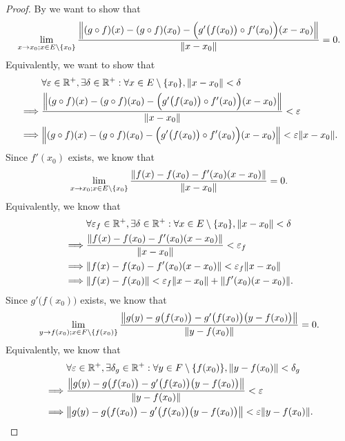\begin{proof}
  By  we want to show that
  \[
    \lim_{x \to x_0 ; x \in E \setminus \set{x_0}} \dfrac{\norm*{(g \circ f)(x) - (g \circ f)(x_0) - \Big(g'\big(f(x_0)\big) \circ f'(x_0)\Big)(x - x_0)}}{\norm*{x - x_0}} = 0.
  \]
  Equivalently, we want to show that
  \begin{align*}
             & \forall \varepsilon \in \R^+, \exists \delta \in \R^+ : \forall x \in E \setminus \set{x_0}, \norm*{x - x_0} < \delta                  \\
    \implies & \dfrac{\norm*{(g \circ f)(x) - (g \circ f)(x_0) - \Big(g'\big(f(x_0)\big) \circ f'(x_0)\Big)(x - x_0)}}{\norm*{x - x_0}} < \varepsilon \\
    \implies & \norm*{(g \circ f)(x) - (g \circ f)(x_0) - \Big(g'\big(f(x_0)\big) \circ f'(x_0)\Big)(x - x_0)} < \varepsilon \norm*{x - x_0}.
  \end{align*}
  Since \(f'(x_0)\) exists, we know that
  \[
    \lim_{x \to x_0 ; x \in E \setminus \set{x_0}} \dfrac{\norm*{f(x) - f(x_0) - f'(x_0)(x - x_0)}}{\norm*{x - x_0}} = 0.
  \]
  Equivalently, we know that
  \begin{align*}
             & \forall \varepsilon_f \in \R^+, \exists \delta \in \R^+ : \forall x \in E \setminus \set{x_0}, \norm*{x - x_0} < \delta \\
    \implies & \dfrac{\norm*{f(x) - f(x_0) - f'(x_0)(x - x_0)}}{\norm*{x - x_0}} < \varepsilon_f                                       \\
    \implies & \norm*{f(x) - f(x_0) - f'(x_0)(x - x_0)} < \varepsilon_f \norm*{x - x_0}                                                \\
    \implies & \norm*{f(x) - f(x_0)} < \varepsilon_f \norm*{x - x_0} + \norm*{f'(x_0)(x - x_0)}.
  \end{align*}
  Since \(g'\big(f(x_0)\big)\) exists, we know that
  \[
    \lim_{y \to f(x_0) ; x \in F \setminus \set{f(x_0)}} \dfrac{\norm*{g(y) - g\big(f(x_0)\big) - g'\big(f(x_0)\big)\big(y - f(x_0)\big)}}{\norm*{y - f(x_0)}} = 0.
  \]
  Equivalently, we know that
  \begin{align*}
             & \forall \varepsilon \in \R^+, \exists \delta_g \in \R^+ : \forall y \in F \setminus \set{f(x_0)}, \norm*{y - f(x_0)} < \delta_g \\
    \implies & \dfrac{\norm*{g(y) - g\big(f(x_0)\big) - g'\big(f(x_0)\big)\big(y - f(x_0)\big)}}{\norm*{y - f(x_0)}} < \varepsilon             \\
    \implies & \norm*{g(y) - g\big(f(x_0)\big) - g'\big(f(x_0)\big)\big(y - f(x_0)\big)} < \varepsilon \norm*{y - f(x_0)}.

\end{align*}
\end{proof}
